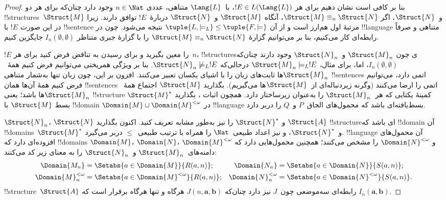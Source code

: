 \documentclass[../../../include/open-logic-section]{subfiles}
\begin{document}
\begin{proof}
بنا بر
 کافی است نشان دهیم برای هر
$!E \in L(\Lang{L})$، با~$\Lang{L}$ متناهی، عددی
$n \in \Nat$ وجود دارد چنان‌که برای هر دو
!!{structure}s~$\Struct{M}$ و~$\Struct{N}$، اگر
$\Struct{M} \equiv_n \Struct{N}$، آنگاه $\Struct{M}$ و~$\Struct{N}$
دربارهٔ~$!E$ توافق دارند. زیرا در این صورت $!E$ با !!{sentence}
مرتبهٔ اول هم‌ارز است و از آن
$\tuple{L, \models_L} \le \tuple{F, \models}$ نتیجه می‌شود. چون در
!!{language} متناهی و صرفاً رابطه‌ای کار می‌کنیم، بنا بر
 می‌توانیم گزارهٔ
$\Struct{M} \equiv_n \Struct{N}$ را با گزارهٔ جبری متناظر
$I_n(\emptyset,\emptyset)$ جایگزین کنیم.

$!E$ را معین بگیرید و برای رسیدن به تناقض فرض کنید برای هر~$n$،
!!{structure}sی چون $\Struct{M}_n$ و~$\Struct{N}_n$ وجود دارند چنان‌که
$I_n(\emptyset, \emptyset)$، اما، برای مثال،
$\Struct{M}_n \models_L !E$ درحالی‌که
$\Struct{N}_n \not\models_L !E$. بنا بر ویژگی همریختی می‌توانیم فرض
کنیم همهٔ~$\Struct{M}_n$ها ثابت‌های زبان را با اشیای یکسان تعبیر
می‌کنند. افزون بر این، چون زبان تنها به‌شمار متناهی !!{sentence}s
اتمی دارد، می‌توانیم فرض کنیم همهٔ آن‌ها همان !!{sentence}s اتمی را
ارضا می‌کنند (وگرنه زیردنباله‌ای از~$\Struct{M}$ها می‌گیریم). بگذارید
$\Struct{M}$ اجتماع همهٔ~$\Struct{M}_n$ها باشد؛ یعنی !!{structure}
کمینهٔ یکتایی که هر~$\Struct{M}_n$ را به‌عنوان زیرساختار دارد.
همچون اثبات
، بگذارید $\Struct{M}^*$ بسط
$\Struct{M}$ با !!{domain}
$\Domain{M} \cup \Domain{M}^{<\omega}$ در !!{language} بسط‌یافته‌ای
باشد که محمول‌های الحاق~$P$ و~$Q$ را دربر دارد.

$\Struct{N}_n$، $\Struct{N}$ و $\Struct{N}^*$ را نیز به‌طور مشابه
تعریف کنید. اکنون بگذارید $\Struct{A}$ !!{structure}ای باشد که
!!{domain} آن !!{domain}s~$\Struct{M}^*$ و~$\Struct{N}^*$، و نیز
اعداد طبیعی~$\Nat$ را همراه با ترتیب طبیعی~$\le$ دربر می‌گیرد.
!!{language} آن محمول‌های افزوده‌ای دارد که !!{domain}s
$\Domain{M}$، $\Domain{N}$، $\Domain{M}^{<\omega}$ و
$\Domain{N}^{<\omega}$ را مشخص می‌کنند؛ همچنین محمول‌هایی دارد که
دامنه‌های~$\Struct{M}_n$ و~$\Struct{N}_n$ را به معنای زیر کد می‌کنند:
\begin{align*}
  \Domain{M_n} & = \Setabs{a \in \Domain{M}}{R(a, n)}; &
  \Domain{N_n} & = \Setabs{a \in \Domain{N}}{S(a,n)}; \\
  \Domain{M}^{<\omega}_n & = \Setabs{a \in \Domain{M}^{<\omega}}{R(a,n)}; &
  \Domain{N}^{<\omega}_n & = \Setabs{a \in \Domain{N}^{<\omega}}{S(a,n)}.
\end{align*}
!!{structure}~$\Struct{A}$ رابطه‌ای سه‌موضعی چون~$J$ نیز دارد چنان‌که
$J(n, \mathbf{a}, \mathbf{b})$ هرگاه و تنها هرگاه برقرار است که
$I_n(\mathbf{a}, \mathbf{b})$.


\end{proof}
\end{document}
